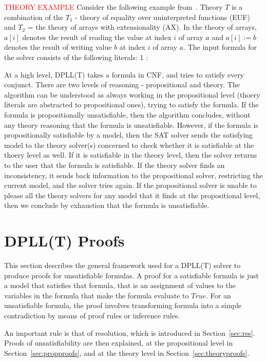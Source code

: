 \documentclass{article}
\begin{document}
\textcolor{red}{THEORY EXAMPLE}
Consider the following example from~\cite{DBLP:conf/fmcad/KatzBTRH16}. Theory $T$ is a 
combination of the $T_1$ - theory of equality over uninterpreted 
functions (EUF) and $T_2$ = the theory of arrays with 
extensionality (AX). In the theory of arrays, $a[i]$ 
denotes the result of reading the value at index $i$ of 
array $a$ and $a[i] := b$ denotes the result of writing 
value $b$ at index $i$ of array $a$. The input formula for 
the solver consists of the following literals:
1 : 
\begin{framed}
At a high level, DPLL(T) takes a formula in CNF, and tries 
to satisfy every conjunct. There are two levels of reasoning 
- propositional and theory. The algorithm can be understood as 
always working in the propositional level (thoery literals
are abstracted to propositional ones), trying to 
satisfy the formula. If the formula is propositionally 
unsatisfiable, then the algorithm concludes, without any 
theory reasoning that the formula is unsatisfiable. However, 
if the formula is propositionally satisfiable by a model, 
then the SAT solver sends the satisfying model to the 
theory solver(s) concerned to check whether it is satisfiable
at the thoery level as well. If it is satisfiable in the 
theory level, then the solver returns to the user that 
the formula is satisfiable. If the theory solver finds an 
inconsistency, it sends back information to the 
propositional solver, restricting the current model, 
and the solver tries again. If the propositional solver 
is unable to please all the theory solvers 
for any model that it finds at the propositional level, then
we conclude by exhaustion that the formula is unsatisfiable.
\end{framed} 


\section{DPLL(T) Proofs}
\label{sec:proofs}
This section describes the general framework used for a 
DPLL(T) solver to produce proofs for unsatisfiable formulas. 
A proof for a satisfiable formula is just a model that 
satisfies that formula, that is an assignment of values to 
the variables in the formula that make the formula evaluate 
to $True$. For an unsatisfiable formula, the proof involves 
transforming formula into a simple contradiction by means 
of proof rules or inference rules. 

An important rule is that of resolution, which is introduced 
in Section~\ref{sec:res}. Proofs of unsatisfiability are then 
explained, at the propositional level in 
Section~\ref{sec:propproofs}, and at the theory level in 
Section~\ref{sec:theoryproofs}.
\end{document}
